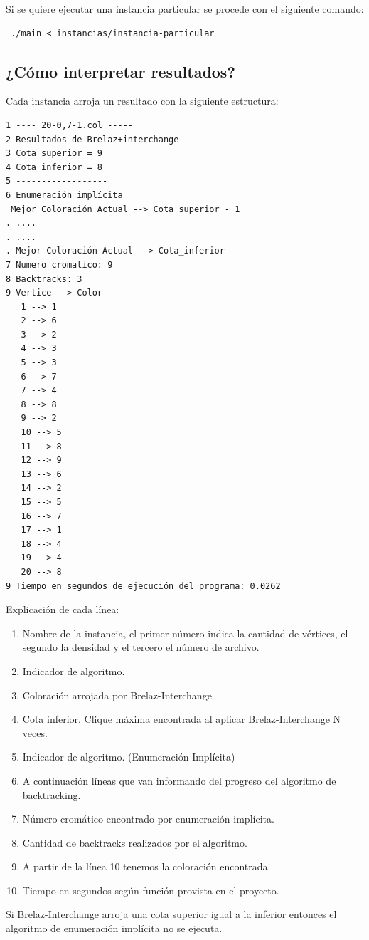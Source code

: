 \documentclass[a4paper,10pt]{article}
\begin{document}
Si se quiere ejecutar una instancia particular se procede con el
siguiente comando:

\begin{verbatim}
 ./main < instancias/instancia-particular
\end{verbatim}

\newpage
\subsection{¿Cómo interpretar resultados?}
Cada instancia arroja un resultado con la siguiente estructura:
\begin{verbatim}
1 ---- 20-0,7-1.col -----
2 Resultados de Brelaz+interchange 
3 Cota superior = 9                
4 Cota inferior = 8                
5 ------------------               
6 Enumeración implícita            
 Mejor Coloración Actual --> Cota_superior - 1
. ....
. ....
. Mejor Coloración Actual --> Cota_inferior
7 Numero cromatico: 9              
8 Backtracks: 3                    
9 Vertice --> Color                
   1 --> 1                          
   2 --> 6                          
   3 --> 2                          
   4 --> 3                          
   5 --> 3                          
   6 --> 7                          
   7 --> 4
   8 --> 8
   9 --> 2
   10 --> 5
   11 --> 8
   12 --> 9
   13 --> 6
   14 --> 2 
   15 --> 5
   16 --> 7
   17 --> 1
   18 --> 4
   19 --> 4
   20 --> 8
9 Tiempo en segundos de ejecución del programa: 0.0262
\end{verbatim}
Explicación de cada línea:
\begin{enumerate}
 \item Nombre de la instancia, el primer número indica la cantidad de vértices, el segundo la densidad y el tercero el número de archivo.
 \item Indicador de algoritmo.
 \item Coloración arrojada por Brelaz-Interchange.
 \item Cota inferior. Clique máxima encontrada al aplicar Brelaz-Interchange N veces.
 \item Indicador de algoritmo. (Enumeración Implícita)
 \item A continuación líneas que van informando del progreso del
       algoritmo de backtracking.
 \item Número cromático encontrado por enumeración implícita.
 \item Cantidad de backtracks realizados por el algoritmo.
 \item A partir de la l\'inea 10 tenemos la coloraci\'on encontrada.
 \item Tiempo en segundos según función provista en el proyecto.
\end{enumerate}
Si Brelaz-Interchange arroja una cota superior igual a la inferior
entonces el algoritmo de enumeración implícita no se ejecuta.
\end{document}
